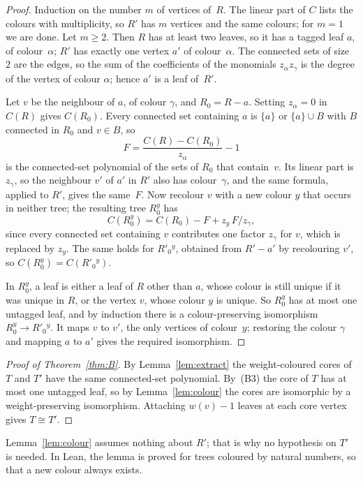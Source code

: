 \documentclass[11pt]{article}
\theoremstyle{definition}
\theoremstyle{remark}
\begin{document}
\begin{proof}
Induction on the number $m$ of vertices of~$R$. The linear part of $C$ lists the
colours with multiplicity, so $R'$ has $m$ vertices and the same colours; for
$m=1$ we are done. Let $m\ge2$. Then $R$ has at least two leaves, so it has a
tagged leaf $a$, of colour~$\alpha$; $R'$ has exactly one vertex $a'$ of
colour~$\alpha$. The connected sets of size~$2$ are the edges, so the sum of the
coefficients of the monomials $z_\alpha z_\gamma$ is the degree of the vertex of
colour $\alpha$; hence $a'$ is a leaf of~$R'$.

Let $v$ be the neighbour of $a$, of colour $\gamma$, and $R_0=R-a$. Setting
$z_\alpha=0$ in $C(R)$ gives $C(R_0)$. Every connected set containing $a$ is
$\{a\}$ or $\{a\}\cup B$ with $B$ connected in $R_0$ and $v\in B$, so
\[
F=\frac{C(R)-C(R_0)}{z_\alpha}-1
\]
is the connected-set polynomial of the sets of $R_0$ that contain~$v$. Its
linear part is $z_\gamma$, so the neighbour $v'$ of $a'$ in $R'$ also has
colour~$\gamma$, and the same formula, applied to $R'$, gives the same~$F$. Now
recolour $v$ with a new colour $y$ that occurs in neither tree; the resulting tree
$R_0^y$ has
\[
C(R_0^y)=C(R_0)-F+z_y\,F/z_\gamma,
\]
since every connected set containing $v$ contributes one factor $z_\gamma$ for
$v$, which is replaced by $z_y$. The same holds for $R'_0{}^{y}$, obtained from
$R'-a'$ by recolouring $v'$, so $C(R_0^y)=C(R'_0{}^{y})$.

In $R_0^y$, a leaf is either a leaf of $R$ other than $a$, whose colour is still
unique if it was unique in $R$, or the vertex $v$, whose colour $y$ is unique.
So $R_0^y$ has at most one untagged leaf, and by induction there is a
colour-preserving isomorphism $R_0^y\to R'_0{}^{y}$. It maps $v$ to $v'$, the
only vertices of colour~$y$; restoring the colour $\gamma$ and mapping $a$ to
$a'$ gives the required isomorphism.
\end{proof}

\begin{proof}[Proof of Theorem~\ref{thm:B}]
By Lemma~\ref{lem:extract} the weight-coloured cores of $T$ and $T'$ have the
same connected-set polynomial. By~(B3) the core of $T$ has at most one untagged
leaf, so by Lemma~\ref{lem:colour} the cores are isomorphic by a
weight-preserving isomorphism. Attaching $w(v)-1$ leaves at each core vertex
gives $T\cong T'$.
\end{proof}

\noindent Lemma~\ref{lem:colour} assumes nothing about $R'$; that is why no
hypothesis on $T'$ is needed. In Lean, the lemma is proved for trees coloured by
natural numbers, so that a new colour always exists.
\end{document}
